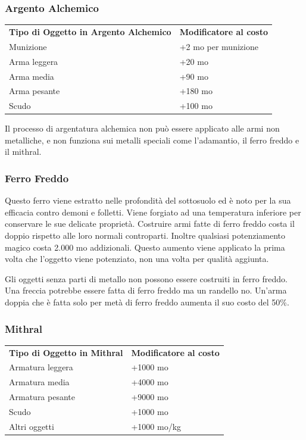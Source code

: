 \documentclass[a4paper,11pt,twoside,openany]{book}
\begin{document}
\subsubsection{Argento Alchemico}

\label{argento-alchemico}

\begin{tabular}{ll}
	\toprule
	\textbf{Tipo di Oggetto in Argento Alchemico} & \textbf{Modificatore al costo}\tabularnewline
	Munizione                      & +2 mo per munizione\tabularnewline
	Arma leggera                   & +20 mo\tabularnewline
	Arma media                     & +90 mo\tabularnewline
	Arma pesante                   & +180 mo\tabularnewline
	Scudo                         & +100 mo\tabularnewline
\end{tabular}

Il processo di argentatura alchemica non può essere applicato alle armi non metalliche, e non funziona sui metalli speciali come l'adamantio, il ferro freddo e il mithral.

\subsubsection{Ferro Freddo}

\label{ferro-freddo}

Questo ferro viene estratto nelle profondità del sottosuolo ed è noto per la sua efficacia contro demoni e folletti. Viene forgiato ad una temperatura inferiore per conservare le sue delicate proprietà. Costruire armi fatte di ferro freddo costa il doppio rispetto alle loro normali controparti. Inoltre qualsiasi potenziamento magico costa 2.000 mo addizionali. Questo aumento viene applicato la prima volta che l'oggetto viene potenziato, non una volta per qualità aggiunta.

Gli oggetti senza parti di metallo non possono essere costruiti in ferro freddo. Una freccia potrebbe essere fatta di ferro freddo ma un randello no. Un'arma doppia che è fatta solo per metà di ferro freddo aumenta il suo costo del 50\%.

\subsubsection{Mithral}

\label{mithral}

\begin{tabular}{ll}
	\toprule
	\textbf{Tipo di Oggetto in Mithral} & \textbf{Modificatore al costo}\tabularnewline
	Armatura leggera                    & +1000 mo\tabularnewline
	Armatura media                      & +4000 mo\tabularnewline
	Armatura pesante                    & +9000 mo\tabularnewline
	Scudo                               & +1000 mo\tabularnewline
	Altri oggetti                       & +1000 mo/kg\tabularnewline
\end{tabular}
\end{document}
